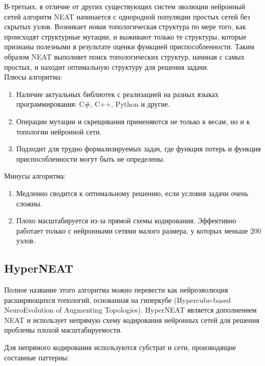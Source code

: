 В-третьих, в отличие от других существующих систем эволюции нейронный сетей алгоритм NEAT начинается с однородной популяции простых сетей без скрытых узлов. Возникает новая топологическая структура по мере того, как происходят структурные мутации, и выживают только те структуры, которые признаны полезными в результате оценки функцией приспособленности. Таким образом NEAT выполняет поиск топологических структур, начиная с самых простых, и находит оптимальную структуру для решения задачи.\\
%
Плюсы алгоритма:
\begin{enumerate}[--]
    \item Наличие актуальных библиотек с реализацией на разных языках программирования: C\#, C++, Python и другие.
    \item Операции мутации и скрещивания применяются не только к весам, но и к топологии нейронной сети.
    \item Подходит для трудно формализируемых задач, где функция потерь и функция приспособленности могут быть не определены.
\end{enumerate}
%
Минусы алгоритма:
\begin{enumerate}[--]
    \item Медленно сводится к оптимальному решению, если условия задачи очень сложны. 
    \item Плохо масштабируется из-за прямой схемы кодирования. Эффективно работает только с нейронными сетями малого размера, у которых меньше 200 узлов. 
\end{enumerate}

\subsection{HyperNEAT}

Полное название этого алгоритма можно перевести как нейроэволюция расширяющихся топологий, основанная на гиперкубе (Hypercube-based NeuroEvolution of Augmenting Topologies). HyperNEAT является дополнением NEAT и использует непрямую схему кодирования нейронных сетей для решения проблемы плохой масштабируемости.

Для непрямого кодирования используются субстрат и сети, производящие составные паттерны:

